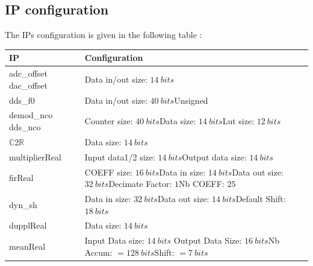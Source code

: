 \documentclass[12pt,oneside]{article}
\begin{document}
\vspace{0.4cm}
\subsection{IP configuration}
\vspace{0.4cm}
The IPs configuration is given in the following table :
\vspace{0.6cm}
\begin{center}
	\begin{tabular}{|>{\centering\arraybackslash}m{.3\linewidth} | >{\centering\arraybackslash}m{.3\linewidth} |}
		\hline
		IP & Configuration \\
		\hline
		\hspace{0.65cm} adc\_offset \newline dac\_offset&Data in/out size: $14~bits$\\
		\hdashline
		dds\_f0& Data in/out size: $40~bits$\newline Unsigned\\
		\hline
		\hspace{0.55cm} demod\_nco \newline dds\_nco & Counter size: $40~bits$\newline Data size: $14~bits$\newline Lut size: $12~bits$\\
		\hline
		$\mathbb{C}$2$\mathbb{R}$& Data size: $14~bits$\\
		\hline
		multiplierReal& Input data1/2 size: $14~bits$\newline Output data size: $14~bits$\\
		\hline
		firReal& COEFF size: $16~bits$\newline Data in size: $14~bits$\newline Data out size: $32~bits$\newline Decimate Factor: $1$\newline Nb COEFF: $25$\\
		\hline
		dyn\_sh& Data in size: $32~bits$\newline Data out size: $14~bits$\newline Default Shift: $18~bits$\\
		\hline
		dupplReal& Data size: $14~bits$\\
		\hline
		meanReal&Input Data size: $14~bits$ \newline Output Data Size: $16~bits$\newline Nb Accum: $=128~bits$\newline Shift: $=7~bits$\\
		\hline
		\end{tabular}


\end{center}
\end{document}
